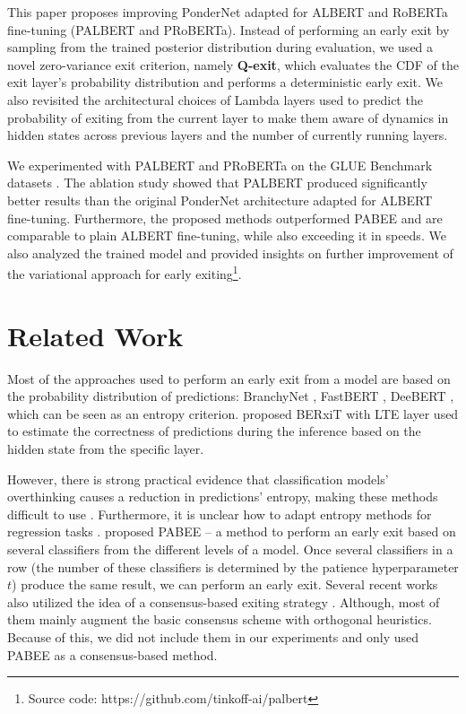\documentclass{article}
\begin{document}
This paper proposes improving PonderNet adapted for ALBERT \citep{albert} and RoBERTa \citep{roberta} fine-tuning (PALBERT and PRoBERTa). Instead of performing an early exit by sampling from the trained posterior distribution during evaluation, we used a novel zero-variance exit criterion, namely \textbf{Q-exit}, which evaluates the CDF of the exit layer's probability distribution and performs a deterministic early exit. We also revisited the architectural choices of Lambda layers used to predict the probability of exiting from the current layer to make them aware of dynamics in hidden states across previous layers and the number of currently running layers.

We experimented with PALBERT and PRoBERTa on the GLUE Benchmark datasets \citep{glue}. The ablation study showed that PALBERT produced significantly better results than the original PonderNet architecture adapted for ALBERT fine-tuning. Furthermore, the proposed methods outperformed PABEE and are comparable to plain ALBERT fine-tuning, while also exceeding it in speeds. We also analyzed the trained model and provided insights on further improvement of the variational approach for early exiting\footnote{Source code: https://github.com/tinkoff-ai/palbert}.



\section{Related Work}


Most of the approaches used to perform an early exit from a model are based on the probability distribution of predictions: BranchyNet \citep{branchynet}, FastBERT \citep{fastbert}, DeeBERT \citep{deebert}, which can be seen as an entropy criterion. \citet{berxit} proposed BERxiT with LTE layer used to estimate the correctness of predictions during the inference based on the hidden state from the specific layer.

However, there is strong practical evidence that classification models' overthinking causes a reduction in predictions' entropy, making these methods difficult to use \citep{pabee}. Furthermore, it is unclear how to adapt entropy methods for regression tasks \citep{pabee}. \citet{pabee} proposed PABEE – a method to perform an early exit based on several classifiers from the different levels of a model. Once several classifiers in a row (the number of these classifiers is determined by the patience hyperparameter $t$) produce the same result, we can perform an early exit. Several recent works also utilized the idea of a consensus-based exiting strategy \citep{leebert, global}. Although, most of them mainly augment the basic consensus scheme with orthogonal heuristics. Because of this, we did not include them in our experiments and only used PABEE as a consensus-based method.
\end{document}
